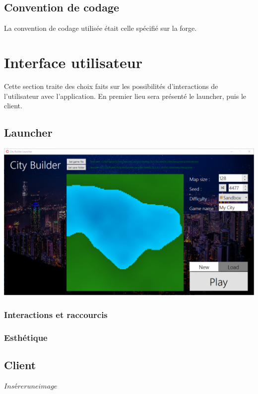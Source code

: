 \documentclass[a4paper,10pt,openany,oneside]{report}
\begin{document}
\subsection{Convention de codage}
La convention de codage utilisée était celle spécifié sur la forge.
\section{Interface utilisateur}
Cette section traite des choix faits sur les possibilités d'interactions de l'utilisateur avec l'application. En premier lieu sera présenté le launcher, puis le client. 
\subsection{Launcher}
\includegraphics[width=\textwidth]{img/ui_launcher.png}
\subsubsection{Interactions et raccourcis}
\subsubsection{Esthétique}
\subsection{Client}
$Insérer une image$
\end{document}
